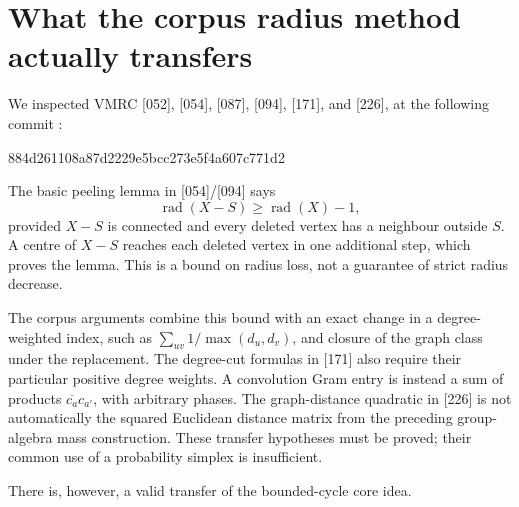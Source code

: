 \documentclass[11pt,a4paper,oneside]{report}
\theoremstyle{definition}
\theoremstyle{remark}
\DeclareMathOperator{\rad}{rad}
\begin{document}
\section{What the corpus radius method actually transfers}\label{M07:sec:corpus}

We inspected VMRC [052], [054], [087], [094], [171], and [226],
at the following commit \cite{B:Corpus}:
\begin{center}\small\ttfamily 884d261108a87d2229e5bcc273e5f4a607c771d2\end{center}
The basic peeling lemma in [054]/[094] says
\begin{equation}\label{M07:eq:graphpeel}
\rad(X-S)\ge\rad(X)-1,
\end{equation}
provided $X-S$ is connected and every deleted vertex has a neighbour
outside $S$. A centre of $X-S$ reaches each deleted vertex in one
additional step, which proves the lemma. This is a bound on radius
loss, not a guarantee of strict radius decrease.

The corpus arguments combine this bound with an exact change in a
degree-weighted index, such as $\sum_{uv}1/\max(d_u,d_v)$,
and closure of the graph class under the replacement. The degree-cut
formulas in [171] also require their particular positive degree
weights. A convolution Gram entry is instead a sum of products
$\overline{c_a}c_{a'}$, with arbitrary phases. The graph-distance
quadratic in [226] is not automatically the squared Euclidean
distance matrix from the preceding group-algebra mass construction.
These transfer hypotheses must be proved; their common use of a
probability simplex is insufficient.

There is, however, a valid transfer of the bounded-cycle core idea.
\end{document}
